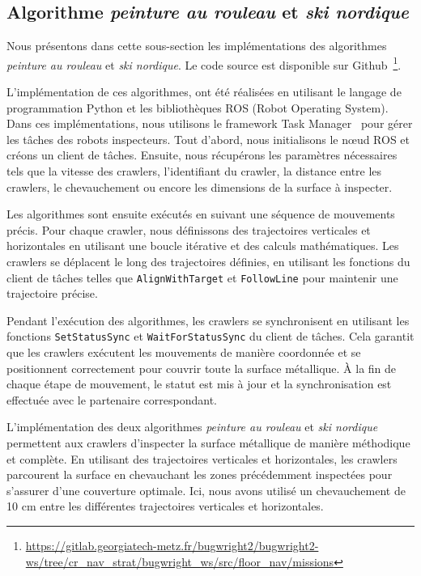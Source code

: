 \documentclass[francais,RandD]{rapportPFE}
\begin{document}
		\subsection*{Algorithme \textit{peinture au rouleau} et \textit{ski nordique}}
			Nous présentons dans cette sous-section les implémentations des algorithmes \textit{peinture au rouleau} et \textit{ski
			nordique}.
			Le code source est disponible sur Github~\footnote{\url{https://gitlab.georgiatech-metz.fr/bugwright2/bugwright2-ws/tree/cr_nav_strat/bugwright_ws/src/floor_nav/missions}}.

			L'implémentation de ces algorithmes, ont été réalisées en utilisant le langage de programmation Python et les bibliothèques ROS (Robot Operating System).
			Dans ces implémentations, nous utilisons le framework Task Manager~\cite{ROSTaskManager} pour gérer les tâches des robots inspecteurs.
			Tout d'abord, nous initialisons le nœud ROS et créons un client de tâches.
			Ensuite, nous récupérons les paramètres nécessaires tels que la vitesse des crawlers, l'identifiant du crawler, la distance entre les crawlers, le chevauchement ou encore les dimensions de la surface à inspecter.

			Les algorithmes sont ensuite exécutés en suivant une séquence de mouvements précis.
			Pour chaque crawler, nous définissons des trajectoires verticales et horizontales en utilisant une boucle itérative et des calculs mathématiques. Les crawlers se déplacent le long des trajectoires définies, en utilisant les fonctions du client de tâches telles que \texttt{AlignWithTarget} et \texttt{FollowLine} pour maintenir une trajectoire précise.

			Pendant l'exécution des algorithmes, les crawlers se synchronisent en utilisant les fonctions \texttt{SetStatusSync} et \texttt{WaitForStatusSync} du client de tâches.
			Cela garantit que les crawlers exécutent les mouvements de manière coordonnée et se positionnent correctement pour couvrir toute la surface métallique.
			À la fin de chaque étape de mouvement, le statut est mis à jour et la synchronisation est effectuée avec le partenaire correspondant.

			L'implémentation des deux algorithmes \textit{peinture au rouleau} et \textit{ski nordique} permettent aux crawlers d'inspecter la surface métallique de manière méthodique et complète.
			En utilisant des trajectoires verticales et horizontales, les crawlers parcourent la surface en chevauchant les zones précédemment inspectées pour s'assurer d'une couverture optimale.
			Ici, nous avons utilisé un chevauchement de 10 cm entre les différentes trajectoires verticales et horizontales.
\end{document}
